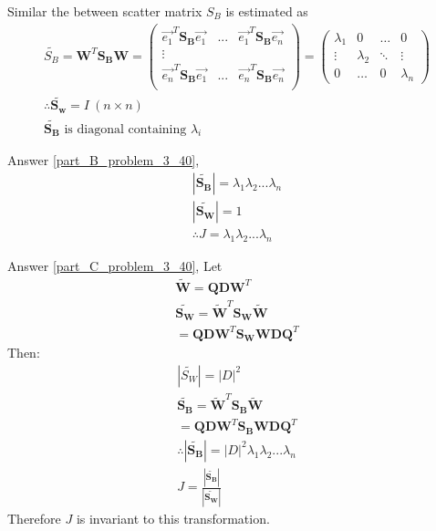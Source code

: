 \documentclass[11pt]{article}
\begin{document}
Similar the between scatter matrix $S_B$ is estimated as
\begin{eqnarray}
	\tilde{S_B} = \mathbf{W}^T \mathbf{S_B} \mathbf{W} = 
	\left(
	\begin{array}{llll}
	\vec{e_1} ^T \mathbf{S_B} \vec{e_1} & ... & \vec{e_1}^T \mathbf{S_B} \vec{e_n} \\
	\vdots \\
	\vec{e_n} ^T \mathbf{S_B} \vec{e_1} & ... & \vec{e_n}^T \mathbf{S_B} \vec{e_n} \\
	\end{array}
	\right) = 
	\left(
	\begin{array}{ llll}
		\lambda_1 & 0 & \ldots & 0  \\
		\vdots & \lambda _2 & \ddots & \vdots \\
		0 & \ldots & 0 & \lambda_n 
	\end{array}
	\right) \\
	\therefore \tilde{\mathbf{S_w}} = I ~ (n \times n) \\
	\tilde{\mathbf{S_B}} \textrm{ is diagonal containing } \lambda_i 
\end{eqnarray}

Answer \ref{part_B_problem_3_40}, 
\begin{eqnarray}
	|\tilde{\mathbf{S_B}} | = \lambda_1 \lambda_2 ... \lambda_n \\
	| \tilde{\mathbf{S_W}} | = 1 \\
	\therefore J = \lambda_1 \lambda_2 ... \lambda_n
\end{eqnarray}

Answer \ref{part_C_problem_3_40}, Let 
\begin{eqnarray}
\tilde{\mathbf{W}} = \mathbf{QDW}^T \\
\tilde{\mathbf{S_W}} = \tilde{\mathbf{W}} ^T \mathbf{S_W} \tilde{\mathbf{W}} \\
= \mathbf{Q}\mathbf{D}\mathbf{W}^T \mathbf{S_W} \mathbf{WDQ}^T 
\end{eqnarray}
Then: 
\begin{eqnarray}
	| \tilde{S_W} | = |D |^2 \\
	\tilde{\mathbf{S_B}} = \tilde{\mathbf{W}}^T\mathbf{S_B}\tilde{\mathbf{W}} \\
	= \mathbf{Q}\mathbf{D}\mathbf{W}^T \mathbf{S_B} \mathbf{WDQ}^T \\
	\therefore | \tilde{\mathbf{S_B}} | = |D |^2 \lambda_1 \lambda_2 ...\lambda_n \\
	J = \frac{ | \tilde{\mathbf{S_B}} |}{ | \tilde{\mathbf{S_W}}| }  
\end{eqnarray}
Therefore $J$ is invariant to this transformation.
\end{document}
